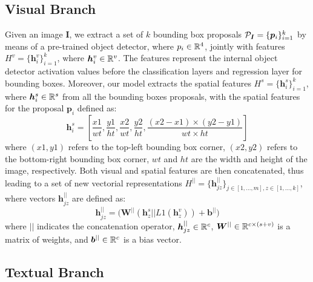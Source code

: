\documentclass{article}
\begin{document}
\subsection{Visual Branch}

Given an image $\bm{I}$, we extract a set of $k$ bounding box
proposals $\mathcal{P}_{\bm{I}} = \{ \bm{p}_i \}^k_{i=1}$ by means of a
pre-trained object detector, where $p_i \in \mathbb{R}^4$, jointly with
features $H^v = \{ \bm{h}^v_i \}^k_{i=1}$, where $\bm{h}^v_i \in
\mathbb{R}^v$. The features represent the internal object detector
activation values before the classification layers and regression
layer for bounding boxes. Moreover, our model extracts the spatial
features $H^s = \{ \bm{h}^s_i \}^k_{i=1}$, where $\bm{h}^s_i \in
\mathbb{R}^s$ from all the bounding boxes proposals, with the spatial
features for the proposal $\bm{p}_i$ defined as:
\begin{equation}
  \bm{h}^s_i = \left[ \frac{x1}{wt}, \frac{y1}{ht}, \frac{x2}{wt}, \frac{y2}{ht}, \frac{(x2 - x1) \times (y2 - y1)}{wt \times ht}  \right]
\end{equation}
where $(x1, y1)$ refers to the top-left bounding box corner, $(x2,
y2)$ refers to the bottom-right bounding box corner, $wt$ and $ht$ are
the width and height of the image, respectively. Both visual and
spatial features are then concatenated, thus leading to a set of new
vectorial representations $H^{||} = \{ \bm{h}^{||}_{jz} \}_{j \in [1,
\ldots, m], z \in [1, \ldots, k]}$, where vectors $\bm{h}^{||}_{jz}$
are defined as:
\begin{equation}
  \bm{h}^{||}_{jz} = \Big( \bm{W}^{||} \left( \bm{h}^s_z || L1(\bm{h}^v_z) \right) + \bm{b}^{||} \Big) 
\end{equation}
where $||$ indicates the concatenation operator, $\bm{h}^{||}_{jz} \in
\mathbb{R}^c$, $\bm{W}^{||} \in \mathbb{R}^{c \times (s + v)}$ is a matrix
of weights, and $\bm{b}^{||} \in \mathbb{R}^c$ is a bias vector.


\subsection{Textual Branch}
\end{document}
